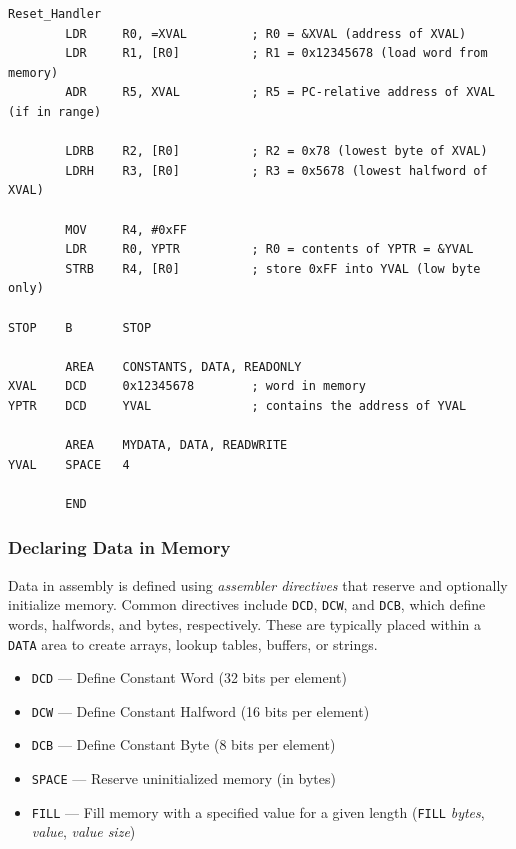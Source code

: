 \begin{lstlisting}[caption={Examples of Load and Store Instructions}]
Reset_Handler
        LDR     R0, =XVAL         ; R0 = &XVAL (address of XVAL)
        LDR     R1, [R0]          ; R1 = 0x12345678 (load word from memory)
        ADR     R5, XVAL          ; R5 = PC-relative address of XVAL (if in range)

        LDRB    R2, [R0]          ; R2 = 0x78 (lowest byte of XVAL)
        LDRH    R3, [R0]          ; R3 = 0x5678 (lowest halfword of XVAL)

        MOV     R4, #0xFF
        LDR     R0, YPTR          ; R0 = contents of YPTR = &YVAL
        STRB    R4, [R0]          ; store 0xFF into YVAL (low byte only)

STOP    B       STOP

        AREA    CONSTANTS, DATA, READONLY
XVAL    DCD     0x12345678        ; word in memory
YPTR    DCD     YVAL              ; contains the address of YVAL

        AREA    MYDATA, DATA, READWRITE
YVAL    SPACE   4

        END
\end{lstlisting}



\subsubsection{Declaring Data in Memory}

Data in assembly is defined using \emph{assembler directives} that reserve and optionally initialize memory.  
Common directives include \texttt{DCD}, \texttt{DCW}, and \texttt{DCB}, which define words, halfwords, and bytes, respectively.  
These are typically placed within a \texttt{DATA} area to create arrays, lookup tables, buffers, or strings.

\begin{itemize}[nosep]
    \item \texttt{DCD} — Define Constant Word (32 bits per element)
    \item \texttt{DCW} — Define Constant Halfword (16 bits per element)
    \item \texttt{DCB} — Define Constant Byte (8 bits per element)
    \item \texttt{SPACE} — Reserve uninitialized memory (in bytes)
    \item \texttt{FILL} — Fill memory with a specified value for a given length (\texttt{FILL} \emph{bytes}, \emph{value}, \emph{value size})
\end{itemize}

